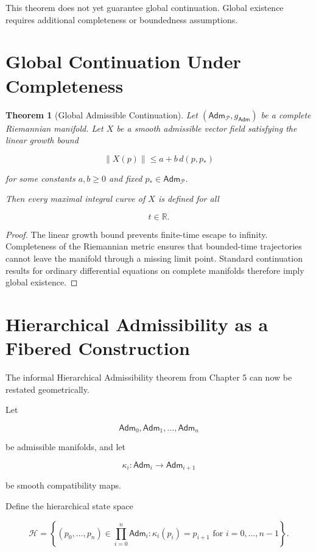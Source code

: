 \documentclass[11pt,oneside]{book}
\numberwithin{equation}{chapter}
\theoremstyle{definition}
\theoremstyle{plain}
\newtheorem{theorem}[definition]{Theorem}
\newcommand{\Adm}{\mathsf{Adm}}
\begin{document}
This theorem does not yet guarantee global continuation. Global existence
requires additional completeness or boundedness assumptions.

\section{Global Continuation Under Completeness}

\begin{theorem}[Global Admissible Continuation]

Let \((\Adm_{\mathcal P},g_{\Adm})\) be a complete Riemannian manifold. Let
\(X\) be a smooth admissible vector field satisfying the linear growth bound

\[
\|X(p)\|
\leq
a+b\,d(p,p_{\ast})
\]

for some constants \(a,b\geq 0\) and fixed
\(p_{\ast}\in\Adm_{\mathcal P}\).

Then every maximal integral curve of \(X\) is defined for all

\[
t\in\mathbb R.
\]

\end{theorem}

\begin{proof}

The linear growth bound prevents finite-time escape to infinity. Completeness of the Riemannian metric ensures that bounded-time trajectories cannot leave the manifold through a missing limit point. Standard continuation results for ordinary differential equations on complete manifolds therefore imply global existence.

\end{proof}

\section{Hierarchical Admissibility as a Fibered Construction}

The informal Hierarchical Admissibility theorem from Chapter 5 can now be
restated geometrically.

Let

\[
\Adm_0,\Adm_1,\ldots,\Adm_n
\]

be admissible manifolds, and let

\[
\kappa_i:
\Adm_i
\longrightarrow
\Adm_{i+1}
\]

be smooth compatibility maps.

Define the hierarchical state space

\[
\mathcal H
=
\left\{
(p_0,\ldots,p_n)
\in
\prod_{i=0}^{n}\Adm_i:
\kappa_i(p_i)=p_{i+1}
\text{ for }i=0,\ldots,n-1
\right\}.
\]
\end{document}
